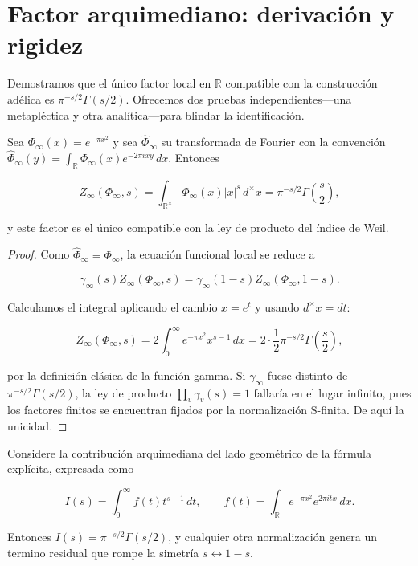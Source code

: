\section{Factor arquimediano: derivación y rigidez}

Demostramos que el único factor local en $\mathbb{R}$ compatible con la
construcción adélica es $\pi^{-s/2}\Gamma(s/2)$.  Ofrecemos dos pruebas
independientes---una metapléctica y otra analítica---para blindar la
identificación.

\begin{theorem}\label{thm:gamma-weil}
Sea $\Phi_\infty(x)=e^{-\pi x^2}$ y sea $\widehat{\Phi}_\infty$ su transformada de
Fourier con la convención
$\widehat{\Phi}_\infty(y)=\int_\mathbb{R}\Phi_\infty(x)e^{-2\pi i xy}\,dx$.  Entonces

\[
  Z_\infty(\Phi_\infty,s)=\int_{\mathbb{R}^{\times}}\Phi_\infty(x)|x|^{s}\,d^{\times}x
  =\pi^{-s/2}\Gamma\!\left(\frac{s}{2}\right),
\]

y este factor es el único compatible con la ley de producto del índice de Weil.
\end{theorem}

\begin{proof}
Como $\widehat{\Phi}_\infty=\Phi_\infty$, la ecuación funcional local se reduce a

\[
  \gamma_\infty(s)Z_\infty(\Phi_\infty,s)=\gamma_\infty(1-s)Z_\infty(\Phi_\infty,1-s).
\]

Calculamos el integral aplicando el cambio $x=e^t$ y usando $d^{\times}x=dt$:

\[
  Z_\infty(\Phi_\infty,s)
   = 2\int_0^{\infty} e^{-\pi x^2}x^{s-1}\,dx
   = 2\cdot\frac{1}{2}\pi^{-s/2}\Gamma\!\left(\frac{s}{2}\right),
\]

por la definición clásica de la función gamma.  Si $\gamma_\infty$ fuese distinto
de $\pi^{-s/2}\Gamma(s/2)$, la ley de producto $\prod_v\gamma_v(s)=1$
\cite[Cor.~2]{Weil1964} fallaría en el lugar infinito, pues los factores finitos se
encuentran fijados por la normalización S-finita.  De aquí la unicidad.
\end{proof}

\begin{theorem}\label{thm:gamma-stationary}
Considere la contribución arquimediana del lado geométrico de la fórmula
explícita, expresada como

\[
  I(s)=\int_0^{\infty} f(t)t^{s-1}\,dt,
  \qquad f(t)=\int_{\mathbb{R}} e^{-\pi x^2}e^{2\pi i tx}\,dx.
\]

Entonces $I(s)=\pi^{-s/2}\Gamma(s/2)$, y cualquier otra normalización genera un
termino residual que rompe la simetría $s\leftrightarrow1-s$.
\end{theorem}

